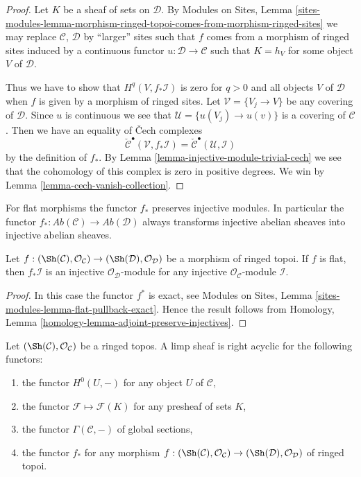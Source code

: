 \begin{proof}
Let $K$ be a sheaf of sets on $\mathcal{D}$.
By
Modules on Sites, Lemma
\ref{sites-modules-lemma-morphism-ringed-topoi-comes-from-morphism-ringed-sites}
we may replace $\mathcal{C}$, $\mathcal{D}$ by ``larger'' sites such
that $f$ comes from a morphism of ringed sites induced by a continuous
functor $u : \mathcal{D} \to \mathcal{C}$ such that
$K = h_V$ for some object $V$ of $\mathcal{D}$.

\medskip\noindent
Thus we have to show that $H^q(V, f_*\mathcal{I})$ is zero
for $q > 0$ and all objects $V$ of $\mathcal{D}$ when $f$ is given
by a morphism of ringed sites. Let $\mathcal{V} = \{V_j \to V\}$
be any covering of $\mathcal{D}$. Since $u$ is continuous we see that
$\mathcal{U} = \{u(V_j) \to u(v)\}$ is a covering of $\mathcal{C}$.
Then we have an equality of {\v C}ech complexes
$$
\check{\mathcal{C}}^\bullet(\mathcal{V}, f_*\mathcal{I})
=
\check{\mathcal{C}}^\bullet(\mathcal{U}, \mathcal{I})
$$
by the definition of $f_*$. By
Lemma \ref{lemma-injective-module-trivial-cech}
we see that the cohomology of this complex is zero in positive degrees.
We win by
Lemma \ref{lemma-cech-vanish-collection}.
\end{proof}

\noindent
For flat morphisms the functor $f_*$ preserves injective modules.
In particular the functor
$f_* : \textit{Ab}(\mathcal{C}) \to \textit{Ab}(\mathcal{D})$ always
 transforms injective
abelian sheaves into injective abelian sheaves.

\begin{lemma}
\label{lemma-pushforward-injective-flat}
Let $f : (\Sh(\mathcal{C}), \mathcal{O}_\mathcal{C}) \to
(\Sh(\mathcal{D}), \mathcal{O}_\mathcal{D})$ be a morphism of ringed topoi.
If $f$ is flat, then $f_*\mathcal{I}$ is an injective
$\mathcal{O}_\mathcal{D}$-module
for any injective $\mathcal{O}_\mathcal{C}$-module $\mathcal{I}$.
\end{lemma}

\begin{proof}
In this case the functor $f^*$ is exact, see
Modules on Sites, Lemma \ref{sites-modules-lemma-flat-pullback-exact}.
Hence the result follows from
Homology, Lemma \ref{homology-lemma-adjoint-preserve-injectives}.
\end{proof}

\begin{lemma}
\label{lemma-limp-acyclic}
Let $(\Sh(\mathcal{C}), \mathcal{O}_\mathcal{C})$ be a ringed topos.
A limp sheaf is right acyclic for the following functors:
\begin{enumerate}
\item the functor $H^0(U, -)$ for any object $U$ of $\mathcal{C}$,
\item the functor $\mathcal{F} \mapsto \mathcal{F}(K)$ for any
presheaf of sets $K$,
\item the functor $\Gamma(\mathcal{C}, -)$ of global sections,
\item the functor $f_*$ for any morphism
$f : (\Sh(\mathcal{C}), \mathcal{O}_\mathcal{C}) \to
(\Sh(\mathcal{D}), \mathcal{O}_\mathcal{D})$ of ringed topoi.
\end{enumerate}
\end{lemma}

